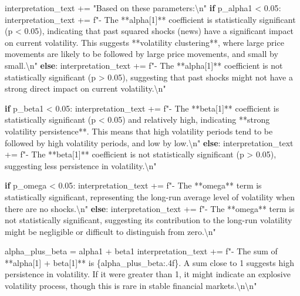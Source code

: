 \documentclass[
  11pt,
]{article}
\newenvironment{Shaded}{}{}
\newcommand{\CharTok}[1]{\textcolor[rgb]{0.25,0.44,0.63}{#1}}
\newcommand{\ControlFlowTok}[1]{\textcolor[rgb]{0.00,0.44,0.13}{\textbf{#1}}}
\newcommand{\FloatTok}[1]{\textcolor[rgb]{0.25,0.63,0.44}{#1}}
\newcommand{\NormalTok}[1]{#1}
\newcommand{\OperatorTok}[1]{\textcolor[rgb]{0.40,0.40,0.40}{#1}}
\newcommand{\SpecialCharTok}[1]{\textcolor[rgb]{0.25,0.44,0.63}{#1}}
\newcommand{\SpecialStringTok}[1]{\textcolor[rgb]{0.73,0.40,0.53}{#1}}
\newcommand{\StringTok}[1]{\textcolor[rgb]{0.25,0.44,0.63}{#1}}
\begin{document}
\begin{Shaded}
\begin{Highlighting}[]
\NormalTok{interpretation\_text }\OperatorTok{+=} \StringTok{"Based on these parameters:}\CharTok{\textbackslash{}n}\StringTok{"}
\ControlFlowTok{if}\NormalTok{ p\_alpha1 }\OperatorTok{\textless{}} \FloatTok{0.05}\NormalTok{:}
\NormalTok{    interpretation\_text }\OperatorTok{+=} \SpecialStringTok{f"{-} The **alpha[1]** coefficient is statistically significant (p \textless{} 0.05), indicating that past squared shocks (news) have a significant impact on current volatility. This suggests **volatility clustering**, where large price movements are likely to be followed by large price movements, and small by small.}\CharTok{\textbackslash{}n}\SpecialStringTok{"}
\ControlFlowTok{else}\NormalTok{:}
\NormalTok{    interpretation\_text }\OperatorTok{+=} \SpecialStringTok{f"{-} The **alpha[1]** coefficient is not statistically significant (p \textgreater{} 0.05), suggesting that past shocks might not have a strong direct impact on current volatility.}\CharTok{\textbackslash{}n}\SpecialStringTok{"}

\ControlFlowTok{if}\NormalTok{ p\_beta1 }\OperatorTok{\textless{}} \FloatTok{0.05}\NormalTok{:}
\NormalTok{    interpretation\_text }\OperatorTok{+=} \SpecialStringTok{f"{-} The **beta[1]** coefficient is statistically significant (p \textless{} 0.05) and relatively high, indicating **strong volatility persistence**. This means that high volatility periods tend to be followed by high volatility periods, and low by low.}\CharTok{\textbackslash{}n}\SpecialStringTok{"}
\ControlFlowTok{else}\NormalTok{:}
\NormalTok{    interpretation\_text }\OperatorTok{+=} \SpecialStringTok{f"{-} The **beta[1]** coefficient is not statistically significant (p \textgreater{} 0.05), suggesting less persistence in volatility.}\CharTok{\textbackslash{}n}\SpecialStringTok{"}

\ControlFlowTok{if}\NormalTok{ p\_omega }\OperatorTok{\textless{}} \FloatTok{0.05}\NormalTok{:}
\NormalTok{    interpretation\_text }\OperatorTok{+=} \SpecialStringTok{f"{-} The **omega** term is statistically significant, representing the long{-}run average level of volatility when there are no shocks.}\CharTok{\textbackslash{}n}\SpecialStringTok{"}
\ControlFlowTok{else}\NormalTok{:}
\NormalTok{    interpretation\_text }\OperatorTok{+=} \SpecialStringTok{f"{-} The **omega** term is not statistically significant, suggesting its contribution to the long{-}run volatility might be negligible or difficult to distinguish from zero.}\CharTok{\textbackslash{}n}\SpecialStringTok{"}

\NormalTok{alpha\_plus\_beta }\OperatorTok{=}\NormalTok{ alpha1 }\OperatorTok{+}\NormalTok{ beta1}
\NormalTok{interpretation\_text }\OperatorTok{+=} \SpecialStringTok{f"{-} The sum of **alpha[1] + beta[1]** is }\SpecialCharTok{\{}\NormalTok{alpha\_plus\_beta}\SpecialCharTok{:.4f\}}\SpecialStringTok{. A sum close to 1 suggests high persistence in volatility. If it were greater than 1, it might indicate an explosive volatility process, though this is rare in stable financial markets.}\CharTok{\textbackslash{}n\textbackslash{}n}\SpecialStringTok{"}


\end{Highlighting}
\end{Shaded}
\end{document}
